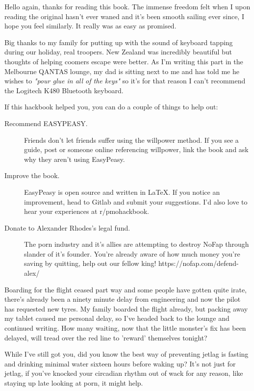 \documentclass[easypeasy.tex]{subfiles}
\begin{document}
Hello again, thanks for reading this book. The immense freedom felt when I upon reading the original hasn't ever waned and it's been smooth sailing ever since, I hope you feel similarly. It really was as easy as promised.

Big thanks to my family for putting up with the sound of keyboard tapping during our holiday, real troopers. New Zealand was incredibly beautiful but thoughts of helping coomers escape were better. As I'm writing this part in the Melbourne QANTAS lounge, my dad is sitting next to me and has told me he wishes to \textit{"pour glue in all of the keys"} so it's for that reason I can't recommend the Logitech K480 Bluetooth keyboard.

If this hackbook helped you, you can do a couple of things to help out:
  \begin{description}
  \item [Recommend EASYPEASY.] Friends don't let friends suffer using the willpower method. If you see a guide, post or someone online referencing willpower, link the book and ask why they aren't using EasyPeasy.

  \item [Improve the book.] EasyPeasy is open source and written in LaTeX. If you notice an improvement, head to Gitlab and submit your suggestions. I'd also love to hear your experiences at r/pmohackbook.

  \item [Donate to Alexander Rhodes's legal fund.] The porn industry and it's allies are attempting to destroy NoFap through slander of it's founder. You're already aware of how much money you're saving by quitting, help out our fellow king! https://nofap.com/defend-alex/
  \end{description}

Boarding for the flight ceased part way and some people have gotten quite irate, there's already been a ninety minute delay from engineering and now the pilot has requested new tyres. My family boarded the flight already, but packing away my tablet caused me personal delay, so I've headed back to the lounge and continued writing. How many waiting, now that the little monster's fix has been delayed, will tread over the red line to 'reward' themselves tonight?

While I've still got you, did you know the best way of preventing jetlag is fasting and drinking minimal water sixteen hours before waking up? It's not just for jetlag, if you've knocked your circadian rhythm out of wack for any reason, like staying up late looking at porn, it might help.
\end{document}
